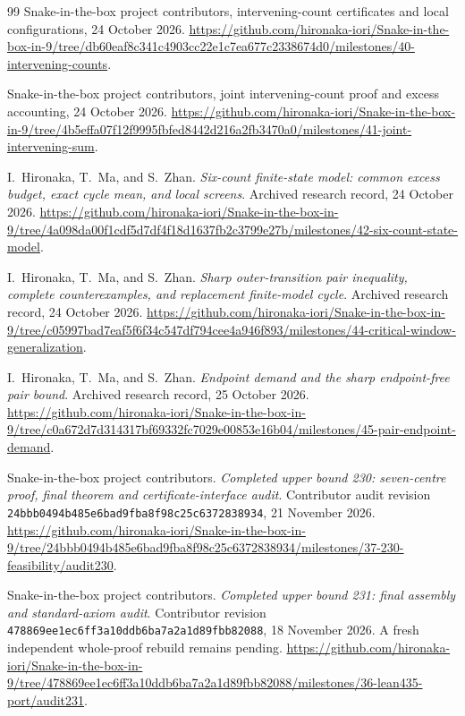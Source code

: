 \documentclass[11pt,a4paper]{article}
\theoremstyle{definition}
\theoremstyle{remark}
\begin{document}
\begin{thebibliography}{99}
Snake-in-the-box project contributors, intervening-count certificates and local configurations, 24 October 2026.
\url{https://github.com/hironaka-iori/Snake-in-the-box-in-9/tree/db60eaf8c341c4903cc22e1c7ea677c2338674d0/milestones/40-intervening-counts}.

Snake-in-the-box project contributors, joint intervening-count proof and excess accounting, 24 October 2026.
\url{https://github.com/hironaka-iori/Snake-in-the-box-in-9/tree/4b5effa07f12f9995fbfed8442d216a2fb3470a0/milestones/41-joint-intervening-sum}.

I.~Hironaka, T.~Ma, and S.~Zhan. \emph{Six-count finite-state model: common excess budget, exact cycle mean, and local screens}. Archived research record, 24 October 2026.
\url{https://github.com/hironaka-iori/Snake-in-the-box-in-9/tree/4a098da00f1cdf5d7df4f18d1637fb2c3799e27b/milestones/42-six-count-state-model}.

I.~Hironaka, T.~Ma, and S.~Zhan. \emph{Sharp outer-transition pair inequality, complete counterexamples, and replacement finite-model cycle}. Archived research record, 24 October 2026.
\url{https://github.com/hironaka-iori/Snake-in-the-box-in-9/tree/c05997bad7eaf5f6f34c547df794cee4a946f893/milestones/44-critical-window-generalization}.

I.~Hironaka, T.~Ma, and S.~Zhan. \emph{Endpoint demand and the sharp endpoint-free pair bound}. Archived research record, 25 October 2026.
\url{https://github.com/hironaka-iori/Snake-in-the-box-in-9/tree/c0a672d7d314317bf69332fc7029e00853e16b04/milestones/45-pair-endpoint-demand}.

Snake-in-the-box project contributors. \emph{Completed upper bound 230:
seven-centre proof, final theorem and certificate-interface audit}.
Contributor audit revision \texttt{24bbb0494b485e6bad9fba8f98c25c6372838934},
21 November 2026.
\url{https://github.com/hironaka-iori/Snake-in-the-box-in-9/tree/24bbb0494b485e6bad9fba8f98c25c6372838934/milestones/37-230-feasibility/audit230}.

Snake-in-the-box project contributors. \emph{Completed upper bound 231:
final assembly and standard-axiom audit}. Contributor revision
\texttt{478869ee1ec6ff3a10ddb6ba7a2a1d89fbb82088}, 18 November 2026.
A fresh independent whole-proof rebuild remains pending.
\url{https://github.com/hironaka-iori/Snake-in-the-box-in-9/tree/478869ee1ec6ff3a10ddb6ba7a2a1d89fbb82088/milestones/36-lean435-port/audit231}.


\end{thebibliography}
\end{document}

